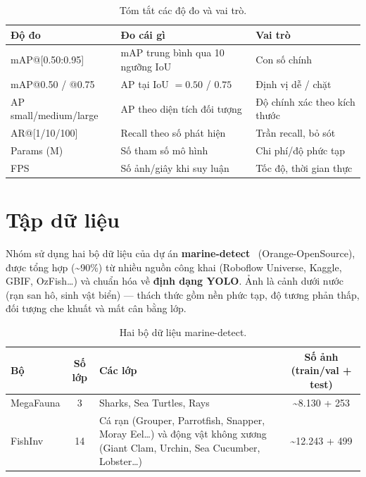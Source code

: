 \documentclass[12pt]{article}
\numberwithin{equation}{section}
\begin{document}
\begin{table}[H]
\centering
\caption{Tóm tắt các độ đo và vai trò.}
\label{tab:metric-summary}
\begin{adjustbox}{max width=\linewidth}
\begin{tabular}{l p{6.5cm} p{5cm}}
\toprule
\textbf{Độ đo} & \textbf{Đo cái gì} & \textbf{Vai trò} \\
\midrule
mAP@[0.50:0.95] & mAP trung bình qua 10 ngưỡng IoU & Con số chính \\
mAP@0.50 / @0.75 & AP tại IoU $=0.50$ / $0.75$ & Định vị dễ / chặt \\
AP small/medium/large & AP theo diện tích đối tượng & Độ chính xác theo kích thước \\
AR@[1/10/100] & Recall theo số phát hiện & Trần recall, bỏ sót \\
Params (M) & Số tham số mô hình & Chi phí/độ phức tạp \\
FPS & Số ảnh/giây khi suy luận & Tốc độ, thời gian thực \\
\bottomrule
\end{tabular}
\end{adjustbox}
\end{table}

\section{Tập dữ liệu}

Nhóm sử dụng hai bộ dữ liệu của dự án \textbf{marine-detect}~\cite{marinedetect}
(Orange-OpenSource), được tổng hợp (\textasciitilde90\%) từ nhiều nguồn công khai (Roboflow
Universe, Kaggle, GBIF, OzFish\dots) và chuẩn hóa về \textbf{định dạng YOLO}. Ảnh là cảnh dưới
nước (rạn san hô, sinh vật biển) --- thách thức gồm nền phức tạp, độ tương phản thấp, đối tượng
che khuất và mất cân bằng lớp.

\begin{table}[H]
\centering
\caption{Hai bộ dữ liệu marine-detect.}
\label{tab:dataset}
\begin{adjustbox}{max width=\linewidth}
\begin{tabular}{l c p{7.5cm} c}
\toprule
\textbf{Bộ} & \textbf{Số lớp} & \textbf{Các lớp} & \textbf{Số ảnh (train/val + test)} \\
\midrule
MegaFauna & 3 & Sharks, Sea Turtles, Rays & \textasciitilde8.130 + 253 \\
FishInv & 14 & Cá rạn (Grouper, Parrotfish, Snapper, Moray Eel\dots) và động vật không xương (Giant Clam, Urchin, Sea Cucumber, Lobster\dots) & \textasciitilde12.243 + 499 \\
\bottomrule
\end{tabular}
\end{adjustbox}
\end{table}
\end{document}
